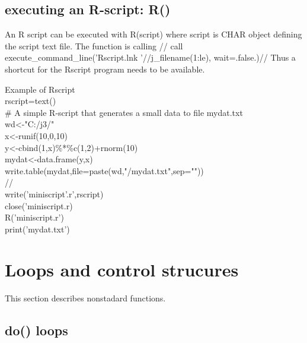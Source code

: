 \subsection{executing an R-script: \textcolor{VioletRed}{R}()}
\label{R}
An R script can be executed with \textcolor{VioletRed}{R}(script) where script is CHAR object
defining the script text file. The function is calling //
call execute\_command\_line('Rscript.lnk '//j\_filename(1:le), wait=.false.)//
Thus a shortcut for the Rscript program needs to be available.
\begin{example}[Rex]Example of Rscript\\
\label{Rex}
rscript=\textcolor{VioletRed}{text}()\\
\# A simple R-script that generates a small data to file mydat.txt\\
wd<-"C:/j3/"\\
x<-runif(10,0,10)\\
y<-cbind(1,x)\%*\%c(1,2)+rnorm(10)\\
mydat<-data.frame(y,x)\\
write.table(mydat,file=paste(wd,"/mydat.txt",sep=""))\\
//\\
\textcolor{VioletRed}{write}('miniscript'.r',rscript)\\
\textcolor{VioletRed}{close}('miniscript.r)\\
\textcolor{VioletRed}{R}('miniscript.r')\\
\textcolor{VioletRed}{print}('mydat.txt')
\end{example}







\section{Loops and control strucures}
\label{loops}
This section describes nonstadard functions.
\subsection{\textcolor{VioletRed}{do}() loops}
\label{do}


